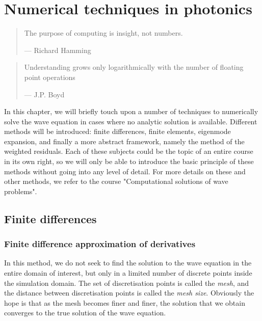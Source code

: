\setcounter{chapter}{2} %

\chapter{Numerical techniques in photonics}
\label{h:numeric}

\begin{quote}
The purpose of computing is insight, not numbers.

--- Richard Hamming
\end{quote}

\begin{quote}
Understanding grows only logarithmically with the number of floating point operations 

--- J.P. Boyd
\end{quote}

\minitoc

In this chapter, we will briefly touch upon a number of techniques to numerically solve the wave equation in cases where no analytic solution is available. Different methods will be introduced: finite differences, finite elements, eigenmode expansion, and finally a more abstract framework, namely the method of the weighted residuals. Each of these subjects could be the topic of an entire course in its own right, so we will only be able to introduce the basic principle of these methods without going into any level of detail. For more details on these and other methods, we refer to the course "Computational solutions of wave problems".

\section{Finite differences}

\subsection{Finite difference approximation of derivatives}

In this method, we do not seek to find the solution to the wave equation in the entire domain of interest, but only in a limited number of discrete points inside the simulation domain. The set of discretisation points is called the \emph{mesh}, and the distance between discretisation points is called the \emph{mesh size}. Obviously the hope is that as the mesh becomes finer and finer, the solution that we obtain converges to the true solution of the wave equation.

